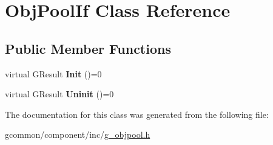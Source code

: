 \hypertarget{class_obj_pool_if}{\section{Obj\-Pool\-If Class Reference}
\label{class_obj_pool_if}
}
\subsection*{Public Member Functions}
\begin{DoxyCompactItemize}
\item 
\hypertarget{class_obj_pool_if_aeff8f83d806dc7527b3513b98736cabb}{virtual G\-Result {\bfseries Init} ()=0}\label{class_obj_pool_if_aeff8f83d806dc7527b3513b98736cabb}

\item 
\hypertarget{class_obj_pool_if_a83c03d896c3ebcb837febc50f8d53d4f}{virtual G\-Result {\bfseries Uninit} ()=0}\label{class_obj_pool_if_a83c03d896c3ebcb837febc50f8d53d4f}

\end{DoxyCompactItemize}


The documentation for this class was generated from the following file\-:\begin{DoxyCompactItemize}
\item 
gcommon/component/inc/\hyperlink{g__objpool_8h}{g\-\_\-objpool.\-h}\end{DoxyCompactItemize}
